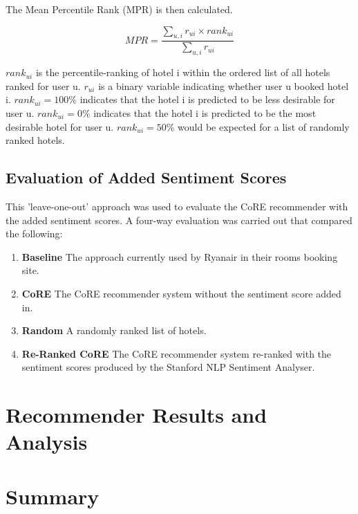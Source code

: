 The Mean Percentile Rank (MPR) is then calculated.

\begin{equation}
    MPR = \frac{ \sum_{u,i} r_{ui} \times rank_{ui} } {\sum_{u,i} r_{ui}}
\end{equation}

$rank_{ui}$ is the percentile-ranking of hotel i within the ordered list of all hotels ranked for user u. $r_{ui}$ is a binary variable indicating whether user u booked hotel i. $rank_{ui} = 100\%$ indicates that the hotel i is predicted to be less desirable for user u. $rank_{ui} = 0\%$ indicates that the hotel i is predicted to be the most desirable hotel for user u. $rank_{ui} = 50\%$ would be expected for a list of randomly ranked hotels.

\subsection{Evaluation of Added Sentiment Scores}

This 'leave-one-out' approach was used to evaluate the CoRE recommender with the added sentiment scores. A four-way evaluation was carried out that compared the following:
\begin{enumerate}
    \item \textbf{Baseline} \newline
    The approach currently used by Ryanair in their rooms booking site.
    \item \textbf{CoRE} \newline
    The CoRE recommender system without the sentiment score added in.
    \item \textbf{Random} \newline
    A randomly ranked list of hotels.
    \item \textbf{Re-Ranked CoRE} \newline
    The CoRE recommender system re-ranked with the sentiment scores produced by the Stanford NLP Sentiment Analyser.
\end{enumerate}

\section{Recommender Results and Analysis}

\section{Summary}

